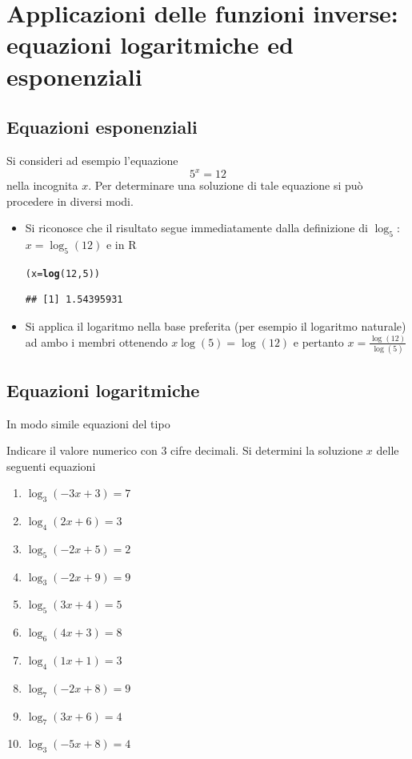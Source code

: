 \documentclass[onecolumn,11pt]{book}\usepackage[]{graphicx}\usepackage[]{color}
\makeatletter
\newcommand{\hlnum}[1]{\textcolor[rgb]{0.686,0.059,0.569}{#1}}%
\newcommand{\hlstd}[1]{\textcolor[rgb]{0.345,0.345,0.345}{#1}}%
\newcommand{\hlkwb}[1]{\textcolor[rgb]{0.69,0.353,0.396}{#1}}%
\newcommand{\hlkwd}[1]{\textcolor[rgb]{0.737,0.353,0.396}{\textbf{#1}}}%
\newenvironment{kframe}{%
 \def\at@end@of@kframe{}%
 \ifinner\ifhmode%
  \def\at@end@of@kframe{\end{minipage}}%
  \begin{minipage}{\columnwidth}%
 \fi\fi%
 \def\FrameCommand##1{\hskip\@totalleftmargin \hskip-\fboxsep
 \colorbox{shadecolor}{##1}\hskip-\fboxsep
     \hskip-\linewidth \hskip-\@totalleftmargin \hskip\columnwidth}%
 \MakeFramed {\advance\hsize-\width
   \@totalleftmargin\z@ \linewidth\hsize
   \@setminipage}}%
 {\par\unskip\endMakeFramed%
 \at@end@of@kframe}
\newenvironment{knitrout}{}{} %
\newcommand{\rpr}{\textsf{R}~}
\makeatother
\begin{document}
\section{Applicazioni delle funzioni inverse: equazioni logaritmiche ed esponenziali}
\subsection{Equazioni esponenziali} Si consideri ad esempio l'equazione
\[ 5^{x}=12\]
nella incognita $x$.
Per determinare una soluzione di tale equazione si pu\`o procedere in diversi modi.
\begin{itemize}
\item Si riconosce che il risultato segue immediatamente dalla definizione di $\log_5$:
$x=\log_5(12)$
e in \rpr
\begin{knitrout}
\color{fgcolor}\begin{kframe}
\begin{alltt}
\hlstd{(x}\hlkwb{=}\hlkwd{log}\hlstd{(}\hlnum{12}\hlstd{,}\hlnum{5}\hlstd{))}
\end{alltt}
\begin{verbatim}
## [1] 1.54395931
\end{verbatim}
\end{kframe}
\end{knitrout}
\item Si applica il logaritmo nella base preferita (per esempio il logaritmo naturale)  ad ambo i membri ottenendo
$x\log(5)=\log(12)$ e pertanto $x=\frac{\log(12)}{\log(5)}$
\end{itemize}

\subsection{Equazioni logaritmiche}
In modo simile equazioni del tipo





Indicare il valore numerico con 3 cifre decimali. Si determini la soluzione $x$ delle seguenti equazioni
\begin{enumerate}
 \item  $\log_ 3 ( -3 x + 3 )= 7 $ \item  $\log_ 4 ( 2 x + 6 )= 3 $ \item  $\log_ 5 ( -2 x + 5 )= 2 $ \item  $\log_ 3 ( -2 x + 9 )= 9 $ \item  $\log_ 5 ( 3 x + 4 )= 5 $ \item  $\log_ 6 ( 4 x + 3 )= 8 $ \item  $\log_ 4 ( 1 x + 1 )= 3 $ \item  $\log_ 7 ( -2 x + 8 )= 9 $ \item  $\log_ 7 ( 3 x + 6 )= 4 $ \item  $\log_ 3 ( -5 x + 8 )= 4 $
\end{enumerate}
\end{document}
